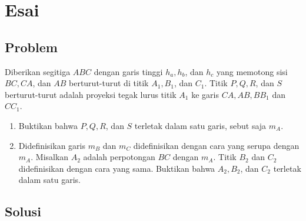 

\section{Esai}
\subsection{Problem}
Diberikan segitiga $ABC$ dengan garis tinggi $h_a, h_b$, dan $h_c$ yang memotong sisi $BC,CA$, dan $AB$ berturut-turut di titik $A_1,B_1$, dan $C_1$. Titik $P,Q,R$, dan $S$ berturut-turut adalah proyeksi tegak lurus titik $A_1$ ke garis $CA,AB,BB_1$ dan $CC_1$. 

\begin{enumerate}
\item Buktikan bahwa $P,Q,R$, dan $S$ terletak dalam satu garis, sebut saja $m_A$.
\item Didefinisikan garis $m_B$ dan $m_C$ didefinisikan dengan cara yang serupa dengan $m_A$. Misalkan $A_2$ adalah perpotongan $BC$ dengan $m_A$. Titik $B_2$ dan $C_2$ didefinisikan dengan cara yang sama. Buktikan bahwa $A_2,B_2$, dan $C_2$ terletak dalam satu garis. 
\end{enumerate}

\subsection{Solusi}


